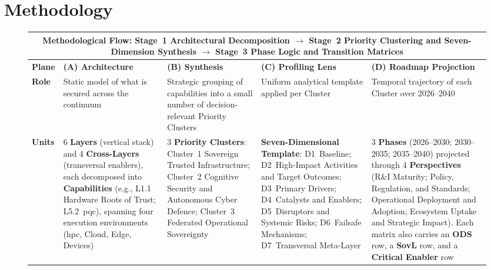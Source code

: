 \documentclass{ieeeaccess}
\begin{document}
\section{Methodology}
\label{sec:method}

\begin{figure}[!t]
\centering
\renewcommand{\arraystretch}{1.25}
\setlength{\tabcolsep}{4pt}
\footnotesize
\begin{tabularx}{\textwidth}{@{}l *{4}{>{\raggedright\arraybackslash}X}@{}}
\toprule
\multicolumn{5}{c}{\cellcolor{layerbg}\parbox{0.96\textwidth}{\centering\textbf{Methodological Flow: Stage~1 Architectural Decomposition $\rightarrow$ Stage~2 Priority Clustering and Seven-Dimension Synthesis $\rightarrow$ Stage~3 Phase Logic and Transition Matrices}}} \\
\midrule
\textbf{Plane} &
\cellcolor{execbg}\textbf{(A) Architecture} &
\cellcolor{crossbg}\textbf{(B) Synthesis} &
\cellcolor{layerbg}\textbf{(C) Profiling Lens} &
\cellcolor{crossbg}\textbf{(D) Roadmap Projection} \\
\midrule
\textbf{Role} &
\cellcolor{execbg}Static model of what is secured across the continuum &
\cellcolor{crossbg}Strategic grouping of capabilities into a small number of decision-relevant Priority Clusters &
\cellcolor{layerbg}Uniform analytical template applied per Cluster &
\cellcolor{crossbg}Temporal trajectory of each Cluster over 2026--2040 \\
\midrule
\textbf{Units} &
\cellcolor{execbg}6 \textbf{Layers} (vertical stack) and 4 \textbf{Cross-Layers} (transversal enablers), each decomposed into \textbf{Capabilities} (e.g., L1.1 Hardware Roots of Trust; L5.2~\gls{pqc}), spanning four execution environments (\gls{hpc}, Cloud, Edge, Devices) &
\cellcolor{crossbg}3 \textbf{Priority Clusters}: Cluster~1 Sovereign Trusted Infrastructure; Cluster~2 Cognitive Security and Autonomous Cyber Defence; Cluster~3 Federated Operational Sovereignty &
\cellcolor{layerbg}\textbf{Seven-Dimensional Template}: D1~Baseline; D2~High-Impact Activities and Target Outcomes; D3~Primary Drivers; D4~Catalysts and Enablers; D5~Disruptors and Systemic Risks; D6~Failsafe Mechanisms; D7~Transversal Meta-Layer &
\cellcolor{crossbg}3 \textbf{Phases} (2026--2030; 2030--2035; 2035--2040) projected through 4 \textbf{Perspectives} (R\&I Maturity; Policy, Regulation, and Standards; Operational Deployment and Adoption; Ecosystem Uptake and Strategic Impact). Each matrix also carries an \textbf{ODS} row, a \textbf{SovL} row, and a \textbf{Critical Enabler} row \\

\end{tabularx}
\end{figure}
\end{document}
